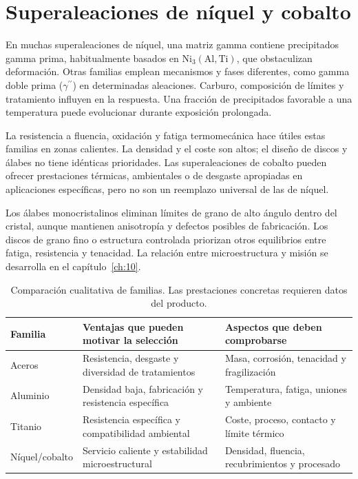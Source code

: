 \section{Superaleaciones de níquel y cobalto}
En muchas superaleaciones de níquel, una matriz gamma contiene precipitados gamma prima, habitualmente basados en $\mathrm{Ni_3(Al,Ti)}$, que obstaculizan deformación. Otras familias emplean mecanismos y fases diferentes, como gamma doble prima ($\gamma^{\prime\prime}$) en determinadas aleaciones. Carburo, composición de límites y tratamiento influyen en la respuesta. Una fracción de precipitados favorable a una temperatura puede evolucionar durante exposición prolongada.

La resistencia a fluencia, oxidación y fatiga termomecánica hace útiles estas familias en zonas calientes. La densidad y el coste son altos; el diseño de discos y álabes no tiene idénticas prioridades. Las superaleaciones de cobalto pueden ofrecer prestaciones térmicas, ambientales o de desgaste apropiadas en aplicaciones específicas, pero no son un reemplazo universal de las de níquel.

Los álabes monocristalinos eliminan límites de grano de alto ángulo dentro del cristal, aunque mantienen anisotropía y defectos posibles de fabricación. Los discos de grano fino o estructura controlada priorizan otros equilibrios entre fatiga, resistencia y tenacidad. La relación entre microestructura y misión se desarrolla en el capítulo~\ref{ch:10}.
\begin{table}[htbp]\centering\small\caption{Comparación cualitativa de familias. Las prestaciones concretas requieren datos del producto.}\label{tab:familias}
\begin{tabular}{p{.18\linewidth}p{.33\linewidth}p{.37\linewidth}}\toprule
Familia & Ventajas que pueden motivar la selección & Aspectos que deben comprobarse\\\midrule
Aceros & Resistencia, desgaste y diversidad de tratamientos & Masa, corrosión, tenacidad y fragilización\\[4pt]
Aluminio & Densidad baja, fabricación y resistencia específica & Temperatura, fatiga, uniones y ambiente\\[4pt]
Titanio & Resistencia específica y compatibilidad ambiental & Coste, proceso, contacto y límite térmico\\[4pt]
Níquel/cobalto & Servicio caliente y estabilidad microestructural & Densidad, fluencia, recubrimientos y procesado\\\bottomrule
\end{tabular}\end{table}
